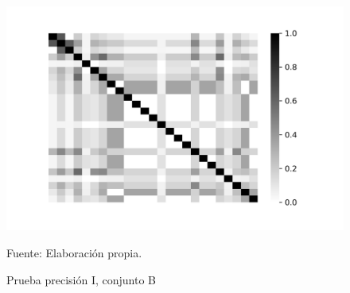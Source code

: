 \begin{figure}[!h]
{\includegraphics[scale=0.41]{images/results/MAP_1407_WIN_W_15_K_5_PRECISION}}
\caption{Prueba precisión I, conjunto B}
Fuente: Elaboración propia.
\label{set_B_precision}
\end{figure}
